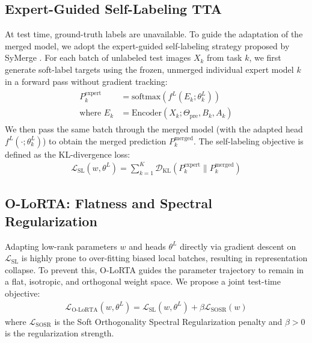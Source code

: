 \documentclass{article}
\theoremstyle{plain}
\theoremstyle{definition}
\theoremstyle{remark}
\begin{document}
\subsection{Expert-Guided Self-Labeling TTA}
At test time, ground-truth labels are unavailable. To guide the adaptation of the merged model, we adopt the expert-guided self-labeling strategy proposed by SyMerge \cite{jung2025symerge}. For each batch of unlabeled test images $X_k$ from task $k$, we first generate soft-label targets using the frozen, unmerged individual expert model $k$ in a forward pass without gradient tracking:
\begin{align}
    \begin{aligned}
        P^{\text{expert}}_k &= \text{softmax}(f^L(E_k; \theta^L_k)) \\
        \text{where } E_k &= \text{Encoder}(X_k; \Theta_{\text{pre}}, B_k, A_k)
    \end{aligned}
\end{align}
We then pass the same batch through the merged model (with the adapted head $f^L(\cdot; \theta^L_k)$) to obtain the merged prediction $P^{\text{merged}}_k$. The self-labeling objective is defined as the KL-divergence loss:
\begin{align}
    \mathcal{L}_{\text{SL}}(w, \theta^L) = \sum_{k=1}^K \mathcal{D}_{\text{KL}}(P^{\text{expert}}_k \parallel P^{\text{merged}}_k)
\end{align}

\subsection{O-LoRTA: Flatness and Spectral Regularization}
Adapting low-rank parameters $w$ and heads $\theta^L$ directly via gradient descent on $\mathcal{L}_{\text{SL}}$ is highly prone to over-fitting biased local batches, resulting in representation collapse. To prevent this, O-LoRTA guides the parameter trajectory to remain in a flat, isotropic, and orthogonal weight space. We propose a joint test-time objective:
\begin{align}
    \label{eq:olorta_obj}
    \mathcal{L}_{\text{O-LoRTA}}(w, \theta^L) = \mathcal{L}_{\text{SL}}(w, \theta^L) + \beta \mathcal{L}_{\text{SOSR}}(w)
\end{align}
where $\mathcal{L}_{\text{SOSR}}$ is the Soft Orthogonality Spectral Regularization penalty and $\beta > 0$ is the regularization strength.
\end{document}

